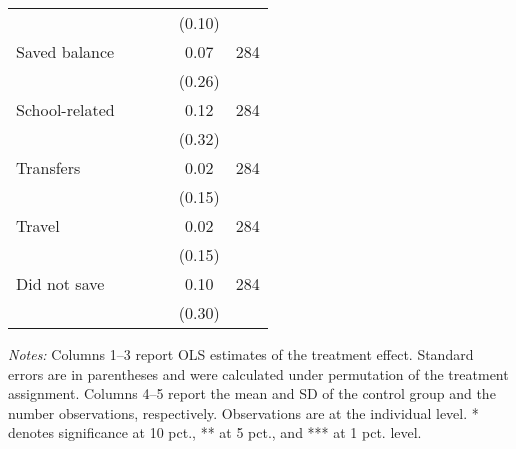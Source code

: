 \begin{table}[h]
{\begin{threeparttable}
\begin{tabular}{l*{5}{c}}
          &         &         &         &   (0.10)&         \\
Saved balance&         &         &         &     0.07&      284\\
          &         &         &         &   (0.26)&         \\
School-related&         &         &         &     0.12&      284\\
          &         &         &         &   (0.32)&         \\
Transfers &         &         &         &     0.02&      284\\
          &         &         &         &   (0.15)&         \\
Travel    &         &         &         &     0.02&      284\\
          &         &         &         &   (0.15)&         \\
Did not save&         &         &         &     0.10&      284\\
          &         &         &         &   (0.30)&         \\
\bottomrule \end{tabular} \begin{tablenotes}[flushleft] \footnotesize \item \emph{Notes:} Columns 1--3 report OLS estimates of the treatment effect. Standard errors are in parentheses and were calculated under permutation of the treatment assignment. Columns 4--5 report the mean and SD of the control group and the number observations, respectively. Observations are at the individual level. * denotes significance at 10 pct., ** at 5 pct., and *** at 1 pct. level. \end{tablenotes} \end{threeparttable} } \end{table}


